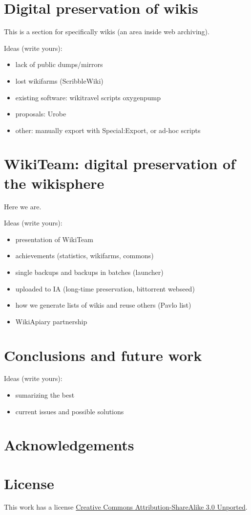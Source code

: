 \documentclass[11pt,twocolumn]{article}
\begin{document}
\section{Digital preservation of wikis}

This is a section for specifically wikis (an area inside web archiving).

Ideas (write yours):
\begin{itemize}
\item lack of public dumps/mirrors
\item lost wikifarms (ScribbleWiki)
\item existing software: wikitravel scripts oxygenpump %
\item proposals: Urobe
\item other: manually export with Special:Export, or ad-hoc scripts
\end{itemize}



\section{WikiTeam: digital preservation of the wikisphere}

Here we are.

Ideas (write yours):
\begin{itemize}
\item presentation of WikiTeam
\item achievements (statistics, wikifarms, commons)
\item single backups and backups in batches (launcher)
\item uploaded to IA (long-time preservation, bittorrent webseed)
\item how we generate lists of wikis and reuse others (Pavlo list)
\item WikiApiary partnership
\end{itemize}


\section{Conclusions and future work}

Ideas (write yours):
\begin{itemize}
\item sumarizing the best
\item current issues and possible solutions
\end{itemize}





\section*{Acknowledgements}


\section*{License}
This work has a license \href{http://creativecommons.org/licenses/by-sa/3.0/}{Creative Commons Attribution-ShareAlike 3.0 Unported}.
\end{document}
